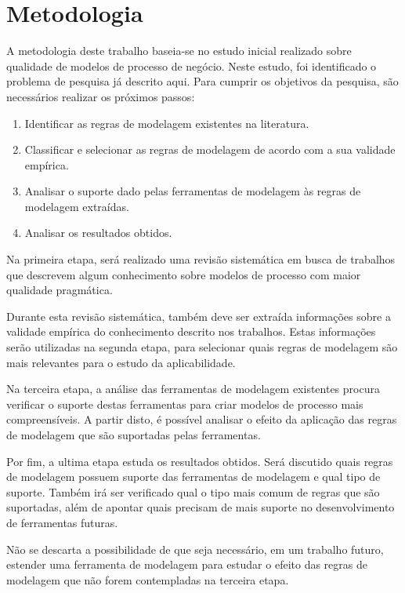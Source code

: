 \documentclass[12pt]{article}
\begin{document}
\newpage
\section{Metodologia}

A metodologia deste trabalho baseia-se no estudo inicial realizado sobre qualidade de modelos de processo de negócio. Neste estudo, foi identificado o problema de pesquisa já descrito aqui. Para cumprir os objetivos da pesquisa, são necessários realizar os próximos passos:
\begin{enumerate}
	\item Identificar as regras de modelagem existentes na literatura.
	\item Classificar e selecionar as regras de modelagem de acordo com a sua validade empírica.
	\item Analisar o suporte dado pelas ferramentas de modelagem às regras de modelagem extraídas.
	\item Analisar os resultados obtidos. %
\end{enumerate}

Na primeira etapa, será realizado uma revisão sistemática em busca de trabalhos que descrevem algum conhecimento sobre modelos de processo com maior qualidade pragmática. 

Durante esta revisão sistemática, também deve ser extraída informações sobre a validade empírica do conhecimento descrito nos trabalhos. Estas informações serão utilizadas na segunda etapa, para selecionar quais regras de modelagem são mais relevantes para o estudo da aplicabilidade.

Na terceira etapa, a análise das ferramentas de modelagem existentes procura verificar o suporte destas ferramentas para criar modelos de processo mais compreensíveis. A partir disto, é possível analisar o efeito da aplicação das regras de modelagem que são suportadas pelas ferramentas.

Por fim, a ultima etapa estuda os resultados obtidos. Será discutido quais regras de modelagem possuem suporte das ferramentas de modelagem e qual tipo de suporte. Também irá ser verificado qual o tipo mais comum de regras que são suportadas, além de apontar quais precisam de mais suporte no desenvolvimento de ferramentas futuras.

Não se descarta a possibilidade de que seja necessário, em um trabalho futuro, estender uma ferramenta de modelagem para estudar o efeito das regras de modelagem que não forem contempladas na terceira etapa.
\end{document}
